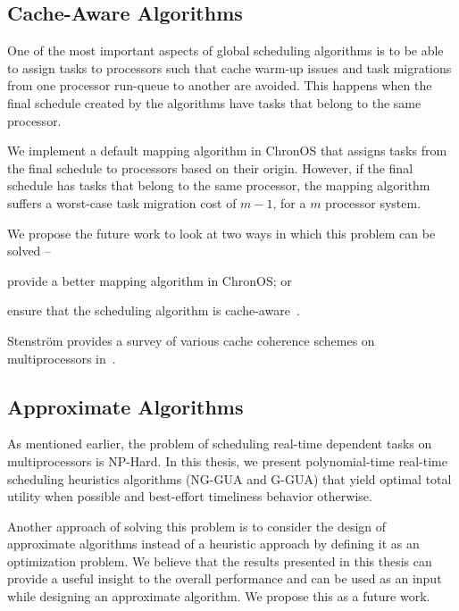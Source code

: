 \documentclass[12pt,dvips]{report}
\begin{document}
\subsection{Cache-Aware Algorithms}
		
		One of the most important aspects of global scheduling algorithms is to be able to assign
		tasks to processors such that cache warm-up issues and task migrations 
		from one processor run-queue to another are avoided. This happens when the final schedule created by the 
		algorithms have tasks that belong to the same processor.
		
		We implement a default mapping algorithm in ChronOS that assigns tasks from the final schedule to processors 
		based on their origin. However, if the final schedule has tasks that belong to the same
		processor, the mapping algorithm suffers a worst-case task migration cost
		of $m-1$, for a $m$ processor system. 
		
		We propose the future work to look at two ways in which this problem can be solved --
		\begin{inparaenum}[(i)]
			\item provide a better mapping algorithm in ChronOS; or
			\item ensure that the scheduling algorithm is cache-aware~\cite{guan-cache-aware, calandrino-cache}. 
		\end{inparaenum}
		Stenstr\"om provides a survey of various cache coherence schemes on multiprocessors in~\cite{CCMultiproc}.
		

\subsection{Approximate Algorithms}
		
		As mentioned earlier, the problem of scheduling real-time dependent tasks on multiprocessors is NP-Hard.
		In this thesis, we present polynomial-time real-time scheduling heuristics algorithms (NG-GUA and G-GUA)
		that yield optimal total utility when possible and best-effort timeliness behavior otherwise.
		
		Another	approach of solving this problem is to consider the design of approximate
		algorithms instead of a heuristic approach by defining it as an optimization problem. We believe that
		the results presented in this thesis can provide a useful insight to the overall performance and can
		be used as an input while designing an approximate algorithm. We propose this as a future work.
 
\end{document}
